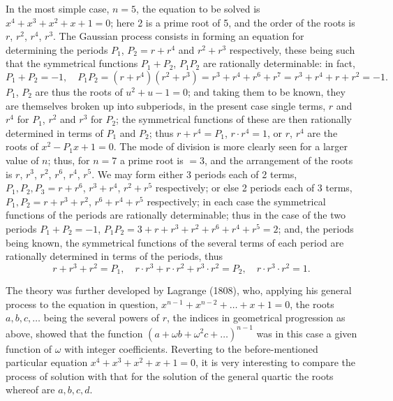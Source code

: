 \documentclass[11pt,a4paper]{book}
\begin{document}
In the most simple case, $n = 5$, the equation to be solved is $x^{4} + x^{3} + x^{2} + x + 1 = 0$; here 2 is a prime root of 5, and the order of the roots is $r$, $r^{2}$, $r^{4}$, $r^{3}$. The Gaussian process consists in forming an equation for determining the periods $P_{1}$, $P_{2} = r + r^{4}$ and $r^{2} + r^{3}$ respectively, these being such that the symmetrical functions $P_{1} + P_{2}$, $P_{1}P_{2}$ are rationally determinable: in fact,
\[
P_{1} + P_{2} = -1, \quad P_{1}P_{2} = (r + r^{4})(r^{2} + r^{3}) = r^{3} + r^{4} + r^{6} + r^{7} = r^{3} + r^{4} + r + r^{2} = -1.
\]
$P_{1}$, $P_{2}$ are thus the roots of $u^{2} + u - 1 = 0$; and taking them to be known, they are themselves broken up into subperiods, in the present case single terms, $r$ and $r^{4}$ for $P_{1}$, $r^{2}$ and $r^{3}$ for $P_{2}$; the symmetrical functions of these are then rationally determined in terms of $P_{1}$ and $P_{2}$; thus $r + r^{4} = P_{1}$, $r \cdot r^{4} = 1$, or $r$, $r^{4}$ are the roots of $x^{2} - P_{1}x + 1 = 0$. The mode of division is more clearly seen for a larger value of $n$; thus, for $n = 7$ a prime root is $= 3$, and the arrangement of the roots is $r$, $r^{3}$, $r^{2}$, $r^{6}$, $r^{4}$, $r^{5}$. We may form either 3 periods each of 2 terms, $P_{1}, P_{2}, P_{3} = r + r^{6}$, $r^{3} + r^{4}$, $r^{2} + r^{5}$ respectively; or else 2 periods each of 3 terms, $P_{1}, P_{2} = r + r^{3} + r^{2}$, $r^{6} + r^{4} + r^{5}$ respectively; in each case the symmetrical functions of the periods are rationally determinable; thus in the case of the two periods $P_{1} + P_{2} = -1$, $P_{1}P_{2} = 3 + r + r^{3} + r^{2} + r^{6} + r^{4} + r^{5} = 2$; and, the periods being known, the symmetrical functions of the several terms of each period are rationally determined in terms of the periods, thus
\[
r + r^{3} + r^{2} = P_{1}, \quad r \cdot r^{3} + r \cdot r^{2} + r^{3} \cdot r^{2} = P_{2}, \quad r \cdot r^{3} \cdot r^{2} = 1.
\]

The theory was further developed by Lagrange (1808), who, applying his general process to the equation in question, $x^{n-1} + x^{n-2} + \ldots + x + 1 = 0$, the roots $a, b, c, \ldots$ being the several powers of $r$, the indices in geometrical progression as above, showed that the function $(a + \omega b + \omega^{2}c + \ldots)^{n-1}$ was in this case a given function of $\omega$ with integer coefficients. Reverting to the before-mentioned particular equation $x^{4} + x^{3} + x^{2} + x + 1 = 0$, it is very interesting to compare the process of solution with that for the solution of the general quartic the roots whereof are $a, b, c, d$.
\end{document}
